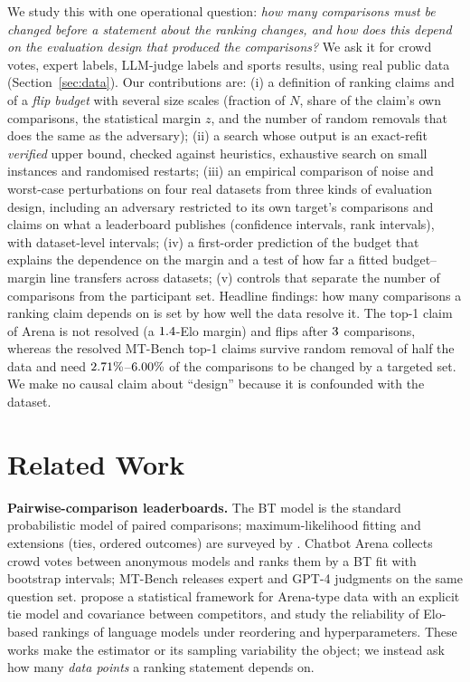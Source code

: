 \documentclass{article}
\begin{document}
We study this with one operational question: \emph{how many comparisons must be changed before a statement about the ranking changes, and how does this depend on the evaluation design that produced the comparisons?} We ask it for crowd votes, expert labels, LLM-judge labels and sports results, using real public data (Section~\ref{sec:data}).
Our contributions are: (i) a definition of ranking claims and of a \emph{flip budget} with several size scales (fraction of $N$, share of the claim's own comparisons, the statistical margin $z$, and the number of random removals that does the same as the adversary); (ii) a search whose output is an exact-refit \emph{verified} upper bound, checked against heuristics, exhaustive search on small instances and randomised restarts; (iii) an empirical comparison of noise and worst-case perturbations on four real datasets from three kinds of evaluation design, including an adversary restricted to its own target's comparisons and claims on what a leaderboard publishes (confidence intervals, rank intervals), with dataset-level intervals; (iv) a first-order prediction of the budget that explains the dependence on the margin and a test of how far a fitted budget--margin line transfers across datasets; (v) controls that separate the number of comparisons from the participant set. Headline findings: how many comparisons a ranking claim depends on is set by how well the data resolve it. The top-1 claim of Arena is not resolved (a $1.4$-Elo margin) and flips after $3$ comparisons, whereas the resolved MT-Bench top-1 claims survive random removal of half the data and need $2.71\%$--$6.00\%$ of the comparisons to be changed by a targeted set. We make no causal claim about ``design'' because it is confounded with the dataset.

\section{Related Work}
\label{sec:related}
\textbf{Pairwise-comparison leaderboards.} The BT model \citep{bradley1952rank} is the standard probabilistic model of paired comparisons; maximum-likelihood fitting and extensions (ties, ordered outcomes) are surveyed by \citet{hunter2004mm}. Chatbot Arena \citep{chiang2024arena} collects crowd votes between anonymous models and ranks them by a BT fit with bootstrap intervals; MT-Bench \citep{zheng2023judging} releases expert and GPT-4 judgments on the same question set. \citet{ameli2024statistical} propose a statistical framework for Arena-type data with an explicit tie model and covariance between competitors, and \citet{boubdir2023elo} study the reliability of Elo-based rankings of language models under reordering and hyperparameters. These works make the estimator or its sampling variability the object; we instead ask how many \emph{data points} a ranking statement depends on.
\end{document}
